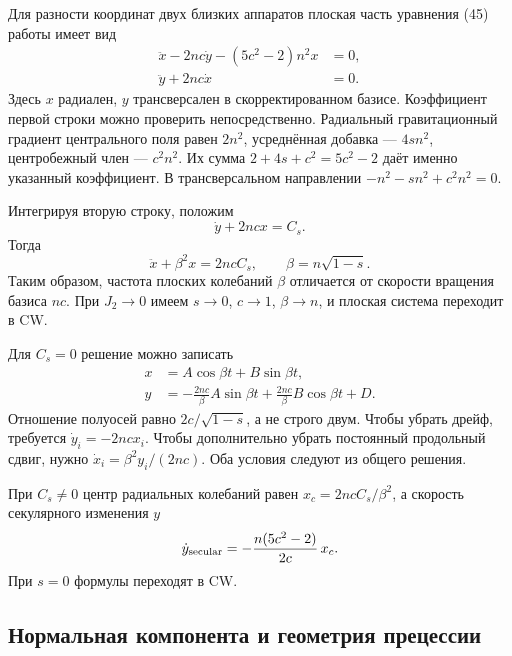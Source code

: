 \documentclass[a4paper,11pt]{article}
\numberwithin{equation}{section}
\theoremstyle{remark}
\begin{document}
Для разности координат двух близких аппаратов плоская
часть уравнения (45) работы \cite{ss} имеет вид
\begin{equation}
 \begin{aligned}
 \ddot x-2nc\dot y-(5c^2-2)n^2x&=0,\\
 \ddot y+2nc\dot x&=0.
 \end{aligned}
 \label{eq:SS-planar}
\end{equation}
Здесь $x$ радиален, $y$ трансверсален в скорректированном базисе.
Коэффициент первой строки можно проверить непосредственно.
Радиальный гравитационный градиент центрального поля равен
$2n^2$, усреднённая добавка --- $4sn^2$, центробежный
член --- $c^2n^2$. Их сумма
$2+4s+c^2=5c^2-2$ даёт именно указанный коэффициент.
В трансверсальном направлении
$-n^2-sn^2+c^2n^2=0$.

Интегрируя вторую строку, положим
\begin{equation}
 \dot y+2ncx=C_s.
 \label{eq:SS-invariant}
\end{equation}
Тогда
\begin{equation}
 \ddot x+\beta^2x=2ncC_s,\qquad
 \beta=n\sqrt{1-s}.
 \label{eq:SS-planar-frequency}
\end{equation}
Таким образом, частота плоских колебаний $\beta$
отличается от скорости вращения базиса $nc$.
При $J_2\to0$ имеем $s\to0$, $c\to1$, $\beta\to n$,
и плоская система переходит в CW.

Для $C_s=0$ решение можно записать
\begin{equation}
 \begin{aligned}
 x&=A\cos\beta t+B\sin\beta t,\\
 y&=-\frac{2nc}{\beta}A\sin\beta t
          +\frac{2nc}{\beta}B\cos\beta t+D.
 \end{aligned}
 \label{eq:SS-bounded-planar}
\end{equation}
Отношение полуосей равно $2c/\sqrt{1-s}$, а не строго двум.
Чтобы убрать дрейф, требуется $\dot y_i=-2ncx_i$.
Чтобы дополнительно убрать постоянный продольный сдвиг,
нужно $\dot x_i=\beta^2y_i/(2nc)$.
Оба условия следуют из общего решения.

При $C_s\ne0$ центр радиальных колебаний равен
$x_c=2ncC_s/\beta^2$, а скорость секулярного изменения $y$
\begin{equation}
 \dot y_{\rm secular}=-\frac{n(5c^2-2)}{2c}\,x_c.
 \label{eq:SS-drift}
\end{equation}
При $s=0$ формулы переходят в CW.

\subsection{Нормальная компонента и геометрия прецессии}
\end{document}
